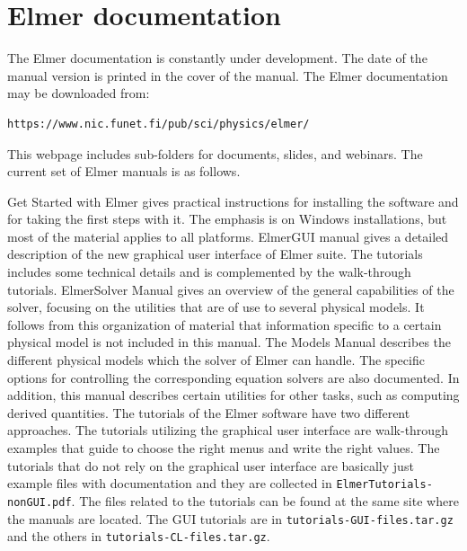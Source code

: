 \section{Elmer documentation}

The Elmer documentation is constantly under development. The date of the manual version is 
printed in the cover of the manual.  The Elmer documentation may be downloaded from:

\begin{verbatim}
https://www.nic.funet.fi/pub/sci/physics/elmer/
\end{verbatim}

This webpage includes sub-folders for documents, slides, and webinars.  The current set of Elmer manuals is as follows.

\sifbegin
{}
	Get Started with Elmer gives practical instructions for installing the software and for
	taking the first steps with it. The emphasis is on Windows installations, but most of the
	material applies to all platforms.
	ElmerGUI manual gives a detailed description of the new graphical user interface of Elmer suite.
 	The tutorials includes some technical details and is complemented by the walk-through tutorials.
	ElmerSolver Manual gives an overview of the general capabilities of the solver,
        focusing on the utilities that are of use to several physical models. It follows 
        from this organization of material that information specific to a certain physical 
        model is not included in this manual.
	The Models Manual describes the different physical models which the solver of Elmer can handle.
        The specific options for controlling the corresponding equation solvers are also documented. 
        In addition, this manual describes certain utilities for other tasks, such as computing
        derived quantities.  
	The tutorials of the Elmer software have two different approaches. The tutorials utilizing the 
	graphical user interface are walk-through examples that guide to choose the right menus and
	write the right values. The tutorials that do not rely on the graphical user interface
 	are basically just example files with documentation and they are collected in 
	\texttt{ElmerTutorials-nonGUI.pdf}.
        The files related to the tutorials can be found at the same site where the manuals
        are located. The GUI tutorials are in
	\texttt{tutorials-GUI-files.tar.gz} and the others in \texttt{tutorials-CL-files.tar.gz}.
